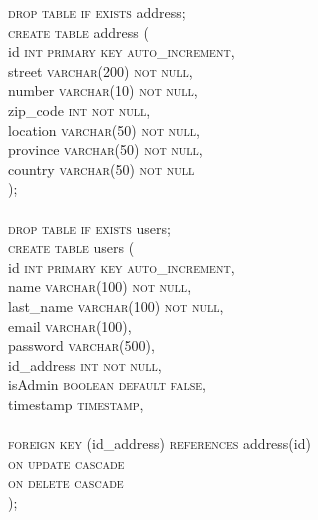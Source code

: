 \documentclass{article}
\begin{document}
 \textsc{\textcolor{sentence}{drop table if exists}} address;\\
 \textsc{\textcolor{sentence}{create table}} address (\\
  \phantom{abc} id \textsc{\textcolor{sentence}{int primary key auto\_increment}},\\
   \phantom{abc} street \textsc{\textcolor{sentence}{varchar\textcolor{numberSQL}{(200)}  not null}},\\
   \phantom{abc} number \textsc{\textcolor{sentence}{varchar\textcolor{numberSQL}{(10)}  not null}},\\
   \phantom{abc} zip\_code \textsc{\textcolor{sentence}{int not null}},\\
   \phantom{abc} location \textsc{\textcolor{sentence}{varchar\textcolor{numberSQL}{(50)} not null}},\\
   \phantom{abc} province \textsc{\textcolor{sentence}{varchar\textcolor{numberSQL}{(50)} not null}},\\
   \phantom{abc} country \textsc{\textcolor{sentence}{varchar\textcolor{numberSQL}{(50)} not null}}\\);\\\\
\textsc{\textcolor{sentence}{drop table if exists}} users;\\
\textsc{\textcolor{sentence}{create table}} users (\\
\phantom{abc} id \textsc{\textcolor{sentence}{int primary key auto\_increment}},\\
\phantom{abc} name \textsc{\textcolor{sentence}{varchar\textcolor{numberSQL}{(100)} not null}},\\
\phantom{abc} last\_name \textsc{\textcolor{sentence}{varchar\textcolor{numberSQL}{(100)} not null}},\\
\phantom{abc} email \textsc{\textcolor{sentence}{varchar\textcolor{numberSQL}{(100)}}},\\
\phantom{abc} password \textsc{\textcolor{sentence}{varchar\textcolor{numberSQL}{(500)}}},\\
\phantom{abc} id\_address \textsc{\textcolor{sentence}{int not null}},\\
\phantom{abc} isAdmin \textsc{\textcolor{sentence}{boolean default false}},\\

\phantom{abc} timestamp \textsc{\textcolor{sentence}{timestamp}},\\\\
\phantom{abc} \textsc{\textcolor{sentence}{foreign key}} (id\_address) \textsc{\textcolor{sentence}{references}} address(id)\\
\phantom{abc} \textsc{\textcolor{sentence}{on update cascade}}\\
\phantom{abc} \textsc{\textcolor{sentence}{on delete  cascade}}\\
);
\end{document}
